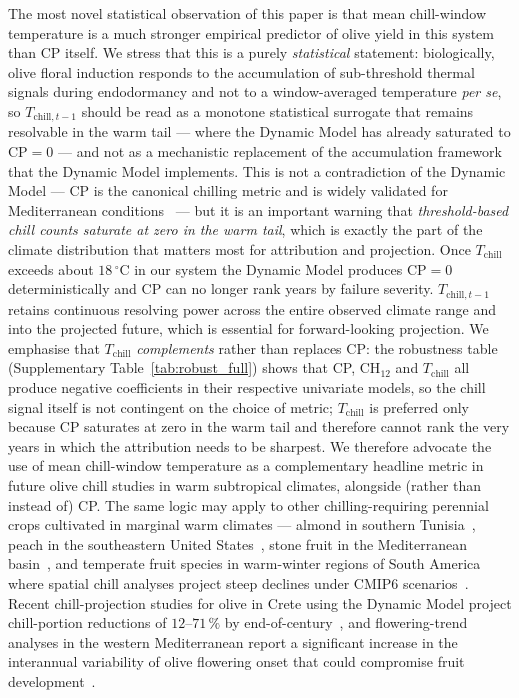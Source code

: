 \documentclass[agronomy,article,submit,pdftex,moreauthors]{Definitions/mdpi}
\begin{document}
The most novel statistical observation of this paper is that mean chill-window temperature is a much stronger empirical predictor of olive yield in this system than CP itself. We stress that this is a purely \emph{statistical} statement: biologically, olive floral induction responds to the accumulation of sub-threshold thermal signals during endodormancy and not to a window-averaged temperature \emph{per se}, so $T_{\text{chill},t-1}$ should be read as a monotone statistical surrogate that remains resolvable in the warm tail --- where the Dynamic Model has already saturated to CP$=0$ --- and not as a mechanistic replacement of the accumulation framework that the Dynamic Model implements. This is not a contradiction of the Dynamic Model --- CP is the canonical chilling metric and is widely validated for Mediterranean conditions~\cite{luedeling2018chillR,luedeling2021phenoflex,benmoussa2017,fernandez2023chill} --- but it is an important warning that \emph{threshold-based chill counts saturate at zero in the warm tail}, which is exactly the part of the climate distribution that matters most for attribution and projection. Once $T_{\text{chill}}$ exceeds about $18\,^\circ$C in our system the Dynamic Model produces CP$=0$ deterministically and CP can no longer rank years by failure severity. $T_{\text{chill},t-1}$ retains continuous resolving power across the entire observed climate range and into the projected future, which is essential for forward-looking projection. We emphasise that $T_{\text{chill}}$ \emph{complements} rather than replaces CP: the robustness table (Supplementary Table~\ref{tab:robust_full}) shows that CP, CH$_{12}$ and $T_{\text{chill}}$ all produce negative coefficients in their respective univariate models, so the chill signal itself is not contingent on the choice of metric; $T_{\text{chill}}$ is preferred only because CP saturates at zero in the warm tail and therefore cannot rank the very years in which the attribution needs to be sharpest. We therefore advocate the use of mean chill-window temperature as a complementary headline metric in future olive chill studies in warm subtropical climates, alongside (rather than instead of) CP. The same logic may apply to other chilling-requiring perennial crops cultivated in marginal warm climates --- almond in southern Tunisia~\cite{benmoussa2017}, peach in the southeastern United States~\cite{parker2019}, stone fruit in the Mediterranean basin~\cite{darbyshire2016}, and temperate fruit species in warm-winter regions of South America where spatial chill analyses project steep declines under CMIP6 scenarios~\cite{fernandez2021warmwinters}. Recent chill-projection studies for olive in Crete using the Dynamic Model project chill-portion reductions of $12$--$71\,\%$ by end-of-century~\cite{grillakis2022olive}, and flowering-trend analyses in the western Mediterranean report a significant increase in the interannual variability of olive flowering onset that could compromise fruit development~\cite{picornell2023olive}.
\end{document}
